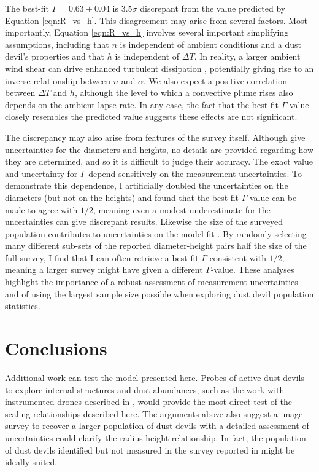 \documentclass{aastex63}
\begin{document}
The best-fit $\Gamma = 0.63 \pm 0.04$ is $3.5\sigma$ discrepant from the value predicted by Equation \ref{eqn:R_vs_h}. This disagreement may arise from several factors. Most importantly, Equation \ref{eqn:R_vs_h} involves several important simplifying assumptions, including that $n$ is independent of ambient conditions and a dust devil's properties and that $h$ is independent of $\Delta T$. In reality, a larger ambient wind shear can drive enhanced turbulent dissipation \citep{arya1988}, potentially giving rise to an inverse relationship between $n$ and $\alpha$. We also expect a positive correlation between $\Delta T$ and $h$, although the level to which a convective plume rises also depends on the ambient lapse rate. In any case, the fact that the best-fit $\Gamma$-value closely resembles the predicted value suggests these effects are not significant.

The discrepancy may also arise from features of the survey itself. Although \citet{2008Icar..197...39S} give uncertainties for the diameters and heights, no details are provided regarding how they are determined, and so it is difficult to judge their accuracy. The exact value and uncertainty for $\Gamma$ depend sensitively on the measurement uncertainties. To demonstrate this dependence, I artificially doubled the uncertainties on the diameters (but not on the heights) and found that the best-fit $\Gamma$-value can be made to agree with $1/2$, meaning even a modest underestimate for the uncertainties can give discrepant results. Likewise the size of the surveyed population contributes to uncertainties on the model fit \citep{2015JGRE..120..401J}. By randomly selecting many different sub-sets of the reported diameter-height pairs half the size of the full survey, I find that I can often retrieve a best-fit $\Gamma$ consistent with $1/2$, meaning a larger survey might have given a different $\Gamma$-value. These analyses highlight the importance of a robust assessment of measurement uncertainties and of using the largest sample size possible when exploring dust devil population statistics.

\section{Conclusions}
\label{sec:conclusions}
Additional work can test the model presented here. Probes of active dust devils to explore internal structures and dust abundances, such as the work with instrumented drones described in \citet{2018RemS...10...65J}, would provide the most direct test of the scaling relationships described here. The arguments above also suggest a image survey to recover a larger population of dust devils with a detailed assessment of uncertainties could clarify the radius-height relationship. In fact, the population of dust devils identified but not measured in the survey reported in \citet{2006JGRE..11112002C} might be ideally suited.
\end{document}
